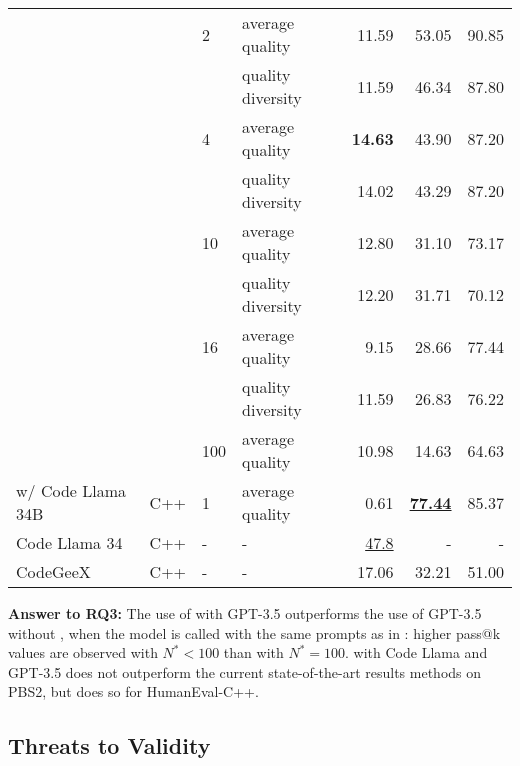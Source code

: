\begin{table}
\begin{tabular}{llllrrr}
&        & 2   & average quality &   11.59 &    53.05 &     90.85 \\
&        &     & quality diversity  &   11.59 &    46.34 &     87.80 \\
&        & 4   & average quality &   \textbf{14.63} &    43.90 &     87.20 \\
&        &     & quality diversity  &   14.02 &    43.29 &     87.20 \\
&        & 10  & average quality &   12.80 &    31.10 &     73.17 \\
&        &     & quality diversity  &   12.20 &    31.71 &     70.12 \\
&        & 16  & average quality &    9.15 &    28.66 &     77.44 \\
&        &     & quality diversity  &   11.59 &    26.83 &     76.22 \\
&        & 100 & average quality &   10.98 &    14.63 &     64.63 \\
\midrule
\method{} w/ Code Llama 34B & C++ & 1 & average quality &    0.61 &    \underline{\textbf{77.44}} &     85.37 \\
\midrule
Code Llama 34 & C++ & - &  - &  \underline{47.8}  &  -   &    - \\
CodeGeeX & C++ & - &  - &  17.06  &  32.21   &    51.00 \\
\bottomrule
\end{tabular}
\end{table}

\begin{highlight}
\textbf{Answer to RQ3:} 
The use of \method{} with GPT-3.5 outperforms the use of GPT-3.5 without \method{}, when the model is called with the same prompts as in \method{}: higher pass@k values are observed with $N^*<100$ than with $N^*=100.$ \method{} with Code Llama and GPT-3.5 does not outperform the current state-of-the-art results methods on PBS2, but does so for HumanEval-C++. 
\end{highlight}

\subsection{Threats to Validity}
\label{sec:threats}



